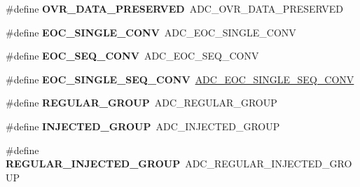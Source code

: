 \begin{DoxyCompactItemize}
\#define {\bfseries O\+V\+R\+\_\+\+D\+A\+T\+A\+\_\+\+P\+R\+E\+S\+E\+R\+V\+ED}~A\+D\+C\+\_\+\+O\+V\+R\+\_\+\+D\+A\+T\+A\+\_\+\+P\+R\+E\+S\+E\+R\+V\+ED
\item 
\mbox{\label{group___h_a_l___a_d_c___aliased___defines_ga8160cf13a85d797ef96972174a863945}} 
\#define {\bfseries E\+O\+C\+\_\+\+S\+I\+N\+G\+L\+E\+\_\+\+C\+O\+NV}~A\+D\+C\+\_\+\+E\+O\+C\+\_\+\+S\+I\+N\+G\+L\+E\+\_\+\+C\+O\+NV
\item 
\mbox{\label{group___h_a_l___a_d_c___aliased___defines_gac7022f73c8906a37c7faf511bc720dda}} 
\#define {\bfseries E\+O\+C\+\_\+\+S\+E\+Q\+\_\+\+C\+O\+NV}~A\+D\+C\+\_\+\+E\+O\+C\+\_\+\+S\+E\+Q\+\_\+\+C\+O\+NV
\item 
\mbox{\label{group___h_a_l___a_d_c___aliased___defines_ga503236c97697e9135a9d1c2c88cac7c9}} 
\#define {\bfseries E\+O\+C\+\_\+\+S\+I\+N\+G\+L\+E\+\_\+\+S\+E\+Q\+\_\+\+C\+O\+NV}~\mbox{\hyperlink{group___a_d_c___e_o_c_selection_ga0cbb4e6ee76ee1bef233212bf947d320}{A\+D\+C\+\_\+\+E\+O\+C\+\_\+\+S\+I\+N\+G\+L\+E\+\_\+\+S\+E\+Q\+\_\+\+C\+O\+NV}}
\item 
\mbox{\label{group___h_a_l___a_d_c___aliased___defines_ga37bac62f24a8600f62d0d35683a0a4de}} 
\#define {\bfseries R\+E\+G\+U\+L\+A\+R\+\_\+\+G\+R\+O\+UP}~A\+D\+C\+\_\+\+R\+E\+G\+U\+L\+A\+R\+\_\+\+G\+R\+O\+UP
\item 
\mbox{\label{group___h_a_l___a_d_c___aliased___defines_gaa5d1cfe7b35cb724d898622cbd6b7894}} 
\#define {\bfseries I\+N\+J\+E\+C\+T\+E\+D\+\_\+\+G\+R\+O\+UP}~A\+D\+C\+\_\+\+I\+N\+J\+E\+C\+T\+E\+D\+\_\+\+G\+R\+O\+UP
\item 
\mbox{\label{group___h_a_l___a_d_c___aliased___defines_ga1e691aaec563e444d3965d5d98d1c47b}} 
\#define {\bfseries R\+E\+G\+U\+L\+A\+R\+\_\+\+I\+N\+J\+E\+C\+T\+E\+D\+\_\+\+G\+R\+O\+UP}~A\+D\+C\+\_\+\+R\+E\+G\+U\+L\+A\+R\+\_\+\+I\+N\+J\+E\+C\+T\+E\+D\+\_\+\+G\+R\+O\+UP
\item 
\mbox{\label{group___h_a_l___a_d_c___aliased___defines_ga21fdc6d3f5ae5c030acc0f5518fbea4a}} 

\end{DoxyCompactItemize}
